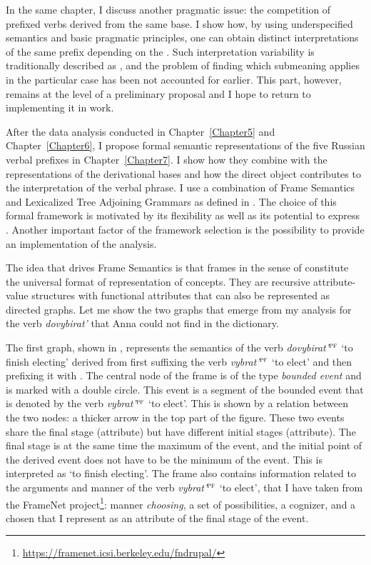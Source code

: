 In the same chapter, I discuss another pragmatic issue: the competition of prefixed verbs derived from the same base. I show how, by using underspecified semantics and basic pragmatic principles, one can obtain distinct interpretations of the same prefix depending on the . Such interpretation variability is traditionally described as , and the problem of finding which submeaning applies in the particular case has been not accounted for earlier. This part, however, remains at the level of a preliminary proposal and I hope to return to implementing it in  work.

After the data analysis conducted in Chapter~\ref{Chapter5} and Chapter~\ref{Chapter6}, I propose formal semantic representations of the five Russian verbal prefixes in Chapter~\ref{Chapter7}. I show how they combine with the representations of the derivational bases and how the direct object contributes to the interpretation of the verbal phrase. I use a combination of Frame Semantics and Lexicalized Tree Adjoining Grammars as defined in \citealt{KallmeyerOsswald:13}. The choice of this formal framework is motivated by its flexibility as well as its potential to express . Another important factor of the framework selection is the possibility to provide an implementation of the analysis. 

The idea that drives Frame Semantics \citep{Loebner:2014} is that frames in the sense of \citet{Barsalou:92} constitute the universal format of representation of concepts. They are recursive attribute-value structures with functional attributes that can also be represented as directed graphs. Let me show the two graphs that emerge from my analysis for the verb \textit{dovybirat'} that Anna could not find in the dictionary.

The first graph, shown in , represents the semantics of the verb \textit{dovybirat'}$^{\textsc{pf}}$ `to finish electing' derived from first suffixing the verb \textit{vybrat'}$^{\textsc{pf}}$ `to elect' and then prefixing it with . The central node of the frame is of the type \textit{bounded event} and is marked with a double circle. This event is a segment of the bounded event that is denoted by the verb \textit{vybrat'}$^{\textsc{pf}}$ `to elect'. This is shown by a relation between the two nodes: a thicker arrow in the top part of the figure. These two events share the final stage (\FIN attribute) but have different initial stages (\INIT attribute). The final stage is at the same time the maximum of the event, and the initial point of the derived event does not have to be the minimum of the event. This is interpreted as `to finish electing'. The frame also contains information related to the arguments and manner of the verb \textit{vybrat'}$^{\textsc{pf}}$ `to elect', that I have taken from the FrameNet project\footnote{\url{https://framenet.icsi.berkeley.edu/fndrupal/}}: manner \textit{choosing}, a set of possibilities, a cognizer, and a chosen that I represent as an attribute of the final stage of the event.

